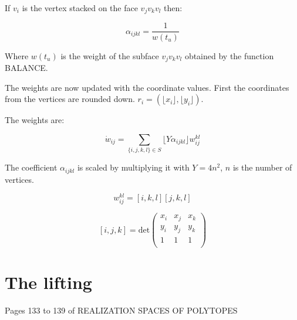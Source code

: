 \documentclass[10pt,a4paper]{article}
\begin{document}
If $v_i$ is the vertex stacked on the face $v_jv_kv_l$ then:

$$\alpha_{ijkl} = \frac{1}{w(t_u)}$$

Where $w(t_u)$ is the weight of the subface $v_jv_kv_l$ obtained by the function BALANCE.

The weights are now updated with the coordinate values. First the coordinates from the vertices are rounded down. $r_i = (\lfloor x_i \rfloor, \lfloor y_i\rfloor)$.

The weights are:

$$\dot{w}_{ij}= \sum_{\{i,j,k,l\}\in S} \lfloor Y \alpha_{ijkl}\rfloor w^{kl}_{ij}$$   

The coefficient $\alpha_{ijkl}$ is scaled by multiplying it with $Y = 4 n^2$, $n$ is the number of vertices.


$$w^{kl}_{ij}= [i,k,l][j,k,l]$$

$$
[i,j,k]= \text{det}
 \begin{pmatrix}
  x_i & x_j & x_k\\
  y_i & y_j & y_k\\
  1	  & 1   & 1  \\
 \end{pmatrix}
$$

\section{The lifting}

Pages 133 to 139 of REALIZATION SPACES OF POLYTOPES
\end{document}
